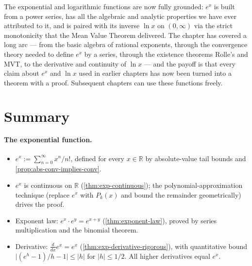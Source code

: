 The exponential and logarithmic functions are now fully grounded: \(e^{x}\) is built from a power series, has all the algebraic and analytic properties we have ever attributed to it, and is paired with its inverse \(\ln x\) on \((0, \infty)\) via the strict monotonicity that the Mean Value Theorem delivered. The chapter has covered a long arc --- from the basic algebra of rational exponents, through the convergence theory needed to define \(e^{x}\) by a series, through the existence theorems Rolle's and MVT, to the derivative and continuity of \(\ln x\) --- and the payoff is that every claim about \(e^{x}\) and \(\ln x\) used in earlier chapters has now been turned into a theorem with a proof. Subsequent chapters can use these functions freely.

\section*{Summary}

\paragraph{The exponential function.}
\begin{itemize}
    \item \(e^{x} := \sum_{n = 0}^{\infty} x^{n}/n!\), defined for every \(x \in \mathbb{R}\) by absolute-value tail bounds and \cref{prop:abs-conv-implies-conv}.
    \item \(e^{x}\) is continuous on \(\mathbb{R}\) (\cref{thm:exp-continuous}); the polynomial-approximation technique (replace \(e^{x}\) with \(P_{k}(x)\) and bound the remainder geometrically) drives the proof.
    \item Exponent law: \(e^{x} \cdot e^{y} = e^{x + y}\) (\cref{thm:exponent-law}), proved by series multiplication and the binomial theorem.
    \item Derivative: \(\frac{d}{dx} e^{x} = e^{x}\) (\cref{thm:exp-derivative-rigorous}), with quantitative bound \(\bigl\lvert (e^{h} - 1)/h - 1 \bigr\rvert \leq \lvert h \rvert\) for \(\lvert h \rvert \leq 1/2\). All higher derivatives equal \(e^{x}\).
\end{itemize}

